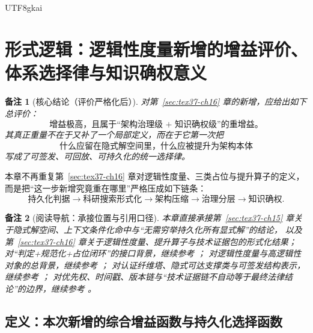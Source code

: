 \documentclass[12pt]{article}
\newtheorem{remark}{备注}[section]
\begin{document}
\begin{CJK*}{UTF8}{gkai}
\section{形式逻辑：逻辑性度量新增的增益评价、体系选择律与知识确权意义}
\label{sec:tex37-ch17}

\begin{remark}[核心结论（评价严格化后）]
对第~\ref{sec:tex37-ch16} 章的新增，应给出如下总评价：
\[
  \boxed{
    \text{增益极高，且属于“架构治理级 + 知识确权级”的重增益。}
  }
\]
其真正重量不在于又补了一个局部定义，而在于它第一次把
\[
  \boxed{
    \text{什么应留在隐式解空间里，什么应被提升为架构本体}
  }
\]
写成了可签发、可回放、可持久化的统一选择律。
\end{remark}

本章不再重复第~\ref{sec:tex37-ch16} 章对逻辑性度量、三类占位与提升算子的定义，
而是把“这一步新增究竟重在哪里”严格压成如下链条：
\[
  \text{持久化判据}
  \to
  \text{科研搜索形式化}
  \to
  \text{架构压缩}
  \to
  \text{治理分层}
  \to
  \text{知识确权}.
\]

\begin{remark}[阅读导航：承接位置与引用口径]
本章直接承接第~\ref{sec:tex37-ch15} 章关于隐式解空间、上下文条件化命中与“无需穷举持久化所有显式解”的结论，
以及第~\ref{sec:tex37-ch16} 章关于逻辑性度量、提升算子与技术证据包的形式化结果；
对“判定+规范化+占位闭环”的接口背景，继续参考
\cite{RepoTex20SemanticGaugeNormalization,RepoTex21AuditedWrapper,RepoTex23SemanticBase}；
对逻辑性度量与高逻辑性对象的总背景，继续参考
\cite{GaoZheng2025GFramework}；
对认证纤维塔、隐式可达支撑类与可签发结构表示，继续参考
\cite{RepoTex35ExtendedCertificationTower,RepoTex36HomotopyTwistBijection,GaoZhengAppVol3}；
对优先权、时间戳、版本链与“技术证据链不自动等于最终法律结论”的边界，继续参考
\cite{RepoTex23PriorityGovernance}。
\end{remark}

\subsection{定义：本次新增的综合增益函数与持久化选择函数}
\label{subsec:tex37-ch17-def}


\end{CJK*}
\end{document}
